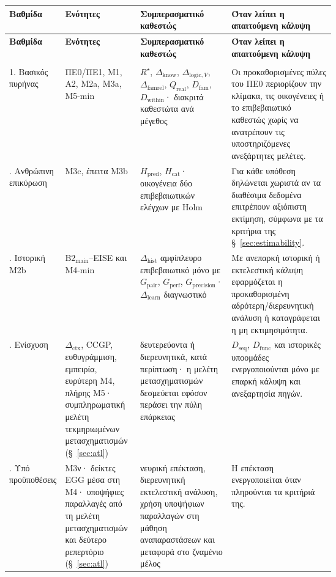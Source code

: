 \documentclass[11pt,a4paper]{article}
\begin{document}
{\footnotesize
\begin{xltabular}{\linewidth}{@{}>{\RaggedRight\arraybackslash}p{0.105\linewidth}>{\RaggedRight\arraybackslash}p{0.23\linewidth}>{\RaggedRight\arraybackslash}p{0.29\linewidth}Y@{}}
\toprule
\textbf{Βαθμίδα} & \textbf{Ενότητες} & \textbf{Συμπερασματικό καθεστώς} & \textbf{Όταν λείπει η απαιτούμενη κάλυψη}\tabularnewline
\midrule
\endfirsthead
\toprule
\textbf{Βαθμίδα} & \textbf{Ενότητες} & \textbf{Συμπερασματικό καθεστώς} & \textbf{Όταν λείπει η απαιτούμενη κάλυψη}\tabularnewline
\midrule
\endhead
\midrule
{}\tabularnewline
\endfoot
\bottomrule
\endlastfoot

1. Βασικός πυρήνας & ΠΕ0/ΠΕ1, Μ1, Α2, Μ2a, Μ3a, Μ5-min & $R^\star$, $\Delta_{\mathrm{know}}$, $\Delta_{\mathrm{logic},V}$, $\Delta_{\mathrm{famrel}}$, $Q_{\mathrm{real}}$, $D_{\mathrm{fam}}$, $D_{\mathrm{within}}$· διακριτά καθεστώτα ανά μέγεθος & Οι προκαθορισμένες πύλες του ΠΕ0 περιορίζουν την κλίμακα, τις οικογένειες ή το επιβεβαιωτικό καθεστώς χωρίς να ανατρέπουν τις υποστηριζόμενες ανεξάρτητες μελέτες.. Ανθρώπινη επικύρωση & M3c, έπειτα M3b & $H_{\mathrm{pred}}$, $H_{\mathrm{cat}}$· οικογένεια δύο επιβεβαιωτικών ελέγχων με Holm & Για κάθε υπόθεση δηλώνεται χωριστά αν τα διαθέσιμα δεδομένα επιτρέπουν αξιόπιστη εκτίμηση, σύμφωνα με τα κριτήρια της §~\ref{sec:estimability}.. Ιστορική Μ2b & $\mathrm{B2}_{\mathrm{main}}$--EISE και Μ4-min & $\Delta_{\mathrm{hist}}$ αμφίπλευρο επιβεβαιωτικό μόνο με $G_{\mathrm{pair}}$, $G_{\mathrm{perf}}$, $G_{\mathrm{precision}}$· $\Delta_{\mathrm{learn}}$ διαγνωστικό & Με ανεπαρκή ιστορική ή εκτελεστική κάλυψη εφαρμόζεται η προκαθορισμένη αδρότερη/διερευνητική ανάλυση ή καταγράφεται η μη εκτιμησιμότητα.. Ενίσχυση & $\Delta_{\mathrm{ctx}}$, CCGP, ευθυγράμμιση, εμπειρία, ευρύτερη M4, πλήρης M5· συμπληρωματική μελέτη τεκμηριωμένων μετασχηματισμών (§~\ref{sec:atl}) & δευτερεύοντα ή διερευνητικά, κατά περίπτωση· η μελέτη μετασχηματισμών δεσμεύεται εφόσον περάσει την πύλη επάρκειας & $D_{\mathrm{seq}}$, $D_{\mathrm{func}}$ και ιστορικές υποομάδες ενεργοποιούνται μόνο με επαρκή κάλυψη και ανεξαρτησία πηγών.. Υπό προϋποθέσεις & M3ν· δείκτες EGG μέσα στη M4· υποψήφιες παραλλαγές από τη μελέτη μετασχηματισμών και δεύτερο ρεπερτόριο (§~\ref{sec:atl}) & νευρική επέκταση, διερευνητική εκτελεστική ανάλυση, χρήση υποψήφιων παραλλαγών στη μάθηση αναπαραστάσεων και μεταφορά στο ζναμένιο μέλος & Η επέκταση ενεργοποιείται όταν πληρούνται τα κριτήριά της.\tabularnewline
\end{xltabular}
}\par
\end{document}

